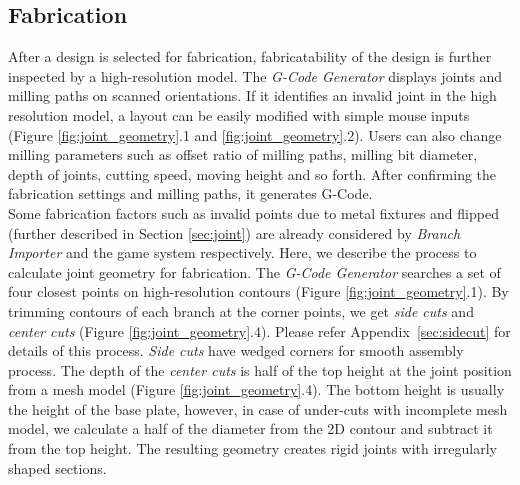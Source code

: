 \subsection{Fabrication}
\label{sec:fabrication}
After a design is selected for fabrication, fabricatability of the design is further inspected by a high-resolution model.
The \textit{G-Code Generator} displays joints and milling paths on scanned orientations.
If it identifies an invalid joint in the high resolution model, a layout can be easily modified with simple mouse inputs (Figure \ref{fig:joint_geometry}.1 and \ref{fig:joint_geometry}.2).
Users can also change milling parameters such as offset ratio of milling paths, milling bit diameter, depth of joints, cutting speed, moving height and so forth.
After confirming the fabrication settings and milling paths, it generates G-Code.\\

Some fabrication factors such as invalid points due to metal fixtures and flipped (further described in Section \ref{sec:joint}) are already considered by \textit{Branch Importer} and the game system respectively.
Here, we describe the process to calculate joint geometry for fabrication.
The \textit{G-Code Generator} searches a set of four closest points on high-resolution contours (Figure \ref{fig:joint_geometry}.1).
By trimming contours of each branch at the corner points, we get \textit{side cuts} and \textit{center cuts} (Figure \ref{fig:joint_geometry}.4).
Please refer Appendix~\ref{sec:sidecut} for details of this process.
\textit{Side cuts} have wedged corners for smooth assembly process.
The depth of the \textit{center cuts} is half of the top height at the joint position from a mesh model (Figure \ref{fig:joint_geometry}.4).
The bottom height is usually the height of the base plate, however, in case of under-cuts with incomplete mesh model, we calculate a half of the diameter from the 2D contour and subtract it from the top height.
The resulting geometry creates rigid joints with irregularly shaped sections.



